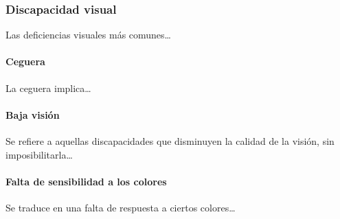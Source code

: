 \documentclass[a4paper]{article}
\begin{document}
\subsubsection[Discapacidad visual]{{D}iscapacidad visual}
{
Las deficiencias visuales más comunes…}

\paragraph[Ceguera]{ Ceguera}
{
La ceguera implica…}


\bigskip

\paragraph[Baja visión]{ Baja visión}
{
{Se refiere a aquellas discapacidades que disminuyen la calidad de la visión, sin imposibilitarla}{…}}


\bigskip

\paragraph[Falta de sensibilidad a los colores ]{ Falta de sensibilidad a los colores }
{
{Se traduce en una falta de respuesta a ciertos colores}{…}}


\bigskip


\bigskip
\end{document}
